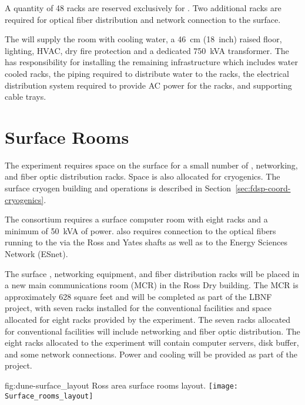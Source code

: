 A quantity of 48 racks are reserved exclusively for .  Two
additional racks are required for optical fiber distribution and
network connection to the surface.

The  will supply the  room with cooling
water, a \SI{46}{cm} (18~inch) raised floor, lighting, HVAC, dry fire protection
and a dedicated 750~kVA transformer.  
The  has responsibility for installing the remaining infrastructure which includes water cooled racks, the piping required to distribute water to the racks,  the electrical distribution system required to provide AC power for the racks, and supporting cable trays.


\section{Surface Rooms}
\label{sec:fdsp-coord-surf-rooms}

The  experiment requires space on the surface for a small
number of , networking, and fiber optic distribution racks.  Space
is also allocated for cryogenics.  The surface cryogen building and
operations is described in 
Section~\ref{sec:fdsp-coord-cryogenics}.

The  consortium requires a surface computer room with eight
racks and a minimum of 50~kVA of power.   also requires connection
to the optical fibers running to the  via the Ross and Yates
shafts as well as to the Energy Sciences Network (ESnet).

The surface , networking equipment, and fiber distribution racks
will be placed in a new main communications room (MCR) in the Ross Dry
building.  The MCR is approximately 628 square feet and will be
completed as part of the LBNF project, with seven racks installed for
the conventional facilities and space allocated for eight racks
provided by the experiment.  The seven racks allocated for
conventional facilities will include networking and fiber optic
distribution.  The eight racks allocated to the experiment will
contain computer servers, disk buffer, and some network connections.
Power and cooling will be provided as part of the  project.
\begin{dunefigure}{fig:dune-surface_layout}
  {Ross area surface rooms layout.}
  \texttt{[image: Surface\_rooms\_layout]}
\end{dunefigure}

